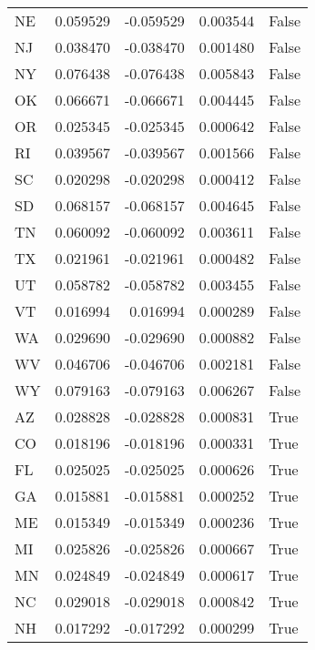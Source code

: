 \begin{table}
\begin{tabular}{lrrrl}
      NE &   0.059529 & -0.059529 &       0.003544 &         False \\
      NJ &   0.038470 & -0.038470 &       0.001480 &         False \\
      NY &   0.076438 & -0.076438 &       0.005843 &         False \\
      OK &   0.066671 & -0.066671 &       0.004445 &         False \\
      OR &   0.025345 & -0.025345 &       0.000642 &         False \\
      RI &   0.039567 & -0.039567 &       0.001566 &         False \\
      SC &   0.020298 & -0.020298 &       0.000412 &         False \\
      SD &   0.068157 & -0.068157 &       0.004645 &         False \\
      TN &   0.060092 & -0.060092 &       0.003611 &         False \\
      TX &   0.021961 & -0.021961 &       0.000482 &         False \\
      UT &   0.058782 & -0.058782 &       0.003455 &         False \\
      VT &   0.016994 &  0.016994 &       0.000289 &         False \\
      WA &   0.029690 & -0.029690 &       0.000882 &         False \\
      WV &   0.046706 & -0.046706 &       0.002181 &         False \\
      WY &   0.079163 & -0.079163 &       0.006267 &         False \\
      AZ &   0.028828 & -0.028828 &       0.000831 &          True \\
      CO &   0.018196 & -0.018196 &       0.000331 &          True \\
      FL &   0.025025 & -0.025025 &       0.000626 &          True \\
      GA &   0.015881 & -0.015881 &       0.000252 &          True \\
      ME &   0.015349 & -0.015349 &       0.000236 &          True \\
      MI &   0.025826 & -0.025826 &       0.000667 &          True \\
      MN &   0.024849 & -0.024849 &       0.000617 &          True \\
      NC &   0.029018 & -0.029018 &       0.000842 &          True \\
      NH &   0.017292 & -0.017292 &       0.000299 &          True \\

\end{tabular}
\end{table}
